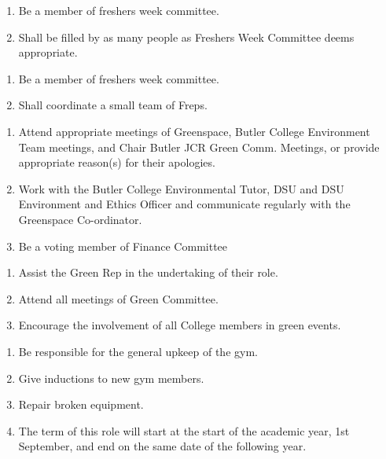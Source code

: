 \begin{enumerate}
    \item Be a member of freshers week committee.
    \item Shall be filled by as many people as Freshers Week Committee deems appropriate.
\end{enumerate}

\begin{enumerate}
    \item Be a member of freshers week committee.
    \item Shall coordinate a small team of Freps.
\end{enumerate}

\begin{enumerate}
    \item Attend appropriate meetings of Greenspace, Butler College Environment Team meetings, and Chair Butler JCR Green Comm. Meetings, or provide appropriate reason(s) for their apologies.
    \item Work with the Butler College Environmental Tutor, DSU and DSU Environment and Ethics Officer and communicate regularly with the Greenspace Co-ordinator.
    \item Be a voting member of Finance Committee
    
\end{enumerate}

\begin{enumerate}
    \item Assist the Green Rep in the undertaking of their role.
    \item Attend all meetings of Green Committee.
    \item Encourage the involvement of all College members in green events.
\end{enumerate}

\begin{enumerate}
    \item Be responsible for the general upkeep of the gym.
    \item Give inductions to new gym members. 
    \item Repair broken equipment.
    \item The term of this role will start at the start of the academic year, 1st September, and end on the same date of the following year.
    
\end{enumerate}

